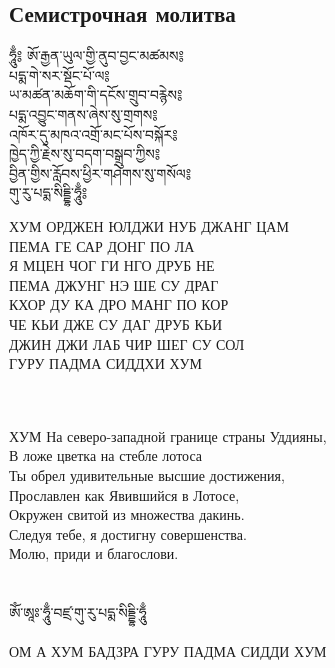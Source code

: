 \subsection*{Семистрочная молитва}

\begingroup
\parbox[t][][l]{0.40\textwidth}{
\ti ཧཱུྃ༔ ཨོ་རྒྱན་ཡུལ་གྱི་ནུབ་བྱང་མཚམས༔\\
པདྨ་གེ་སར་སྡོང་པོ་ལ༔\\
ཡ་མཚན་མཆོག་གི་དངོས་གྲུབ་བརྙེས༔\\
པདྨ་འབྱུང་གནས་ཞེས་སུ་གྲགས༔\\
འཁོར་དུ་མཁའ་འགྲོ་མང་པོས་བསྐོར༔\\
ཁྱེད་ཀྱི་རྗེས་སུ་བདག་བསྒྲུབ་ཀྱིས༔\\
བྱིན་གྱིས་རློབས་ཕྱིར་གཤེགས་སུ་གསོལ༔\\
གུ་རུ་པདྨ་སིདྡྷི་ཧཱུྃ༔\\
\ru
}
\hspace{0.2cm}
\parbox[t][][r]{0.60\textwidth}{
\small
\vspace{0.1cm}
ХУМ ОРДЖЕН ЮЛДЖИ НУБ ДЖАНГ ЦАМ\\
ПЕМА ГЕ САР ДОНГ ПО ЛА\\
Я МЦЕН ЧОГ ГИ НГО ДРУБ НЕ\\
ПЕМА ДЖУНГ НЭ ШЕ СУ ДРАГ\\
КХОР ДУ КА ДРО МАНГ ПО КОР\\
ЧЕ КЬИ ДЖЕ СУ ДАГ ДРУБ КЬИ\\
ДЖИН ДЖИ ЛАБ ЧИР ШЕГ СУ СОЛ\\
ГУРУ ПАДМА СИДДХИ ХУМ\\
}
\endgroup
\\
\\
ХУМ На северо-западной границе страны Уддияны,\\
В ложе цветка на стебле лотоса\\
Ты обрел удивительные высшие достижения,\\
Прославлен как Явившийся в Лотосе,\\
Окружен свитой из множества дакинь.\\
Следуя тебе, я достигну совершенства.\\
Молю, приди и благослови.\\
\\
\\
\ti ཨོཾ་ཨཱཿ་ཧཱུྃ་བཛྲ་གུ་རུ་པདྨ་སིདྡྷི་ཧཱུྃ\\
\\
\ru ОМ А ХУМ БАДЗРА ГУРУ ПАДМА СИДДИ ХУМ

